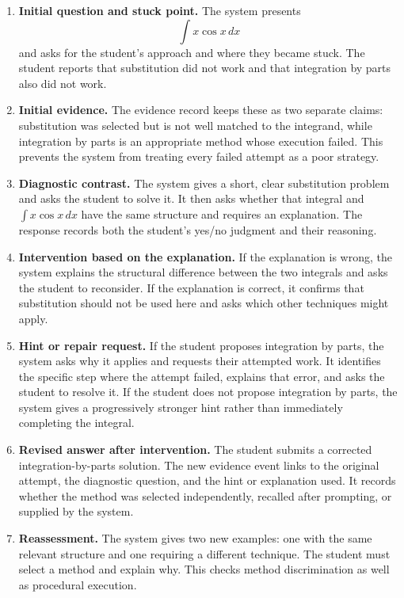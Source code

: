 \documentclass[11pt]{article}
\begin{document}
\begin{enumerate}
    \item \textbf{Initial question and stuck point.} The system presents
    \[
    \int x\cos x\,dx
    \]
    and asks for the student's approach and where they became stuck. The student reports that substitution did not work and that integration by parts also did not work.

    \item \textbf{Initial evidence.} The evidence record keeps these as two separate claims: substitution was selected but is not well matched to the integrand, while integration by parts is an appropriate method whose execution failed. This prevents the system from treating every failed attempt as a poor strategy.

    \item \textbf{Diagnostic contrast.} The system gives a short, clear substitution problem and asks the student to solve it. It then asks whether that integral and $\int x\cos x\,dx$ have the same structure and requires an explanation. The response records both the student's yes/no judgment and their reasoning.

    \item \textbf{Intervention based on the explanation.} If the explanation is wrong, the system explains the structural difference between the two integrals and asks the student to reconsider. If the explanation is correct, it confirms that substitution should not be used here and asks which other techniques might apply.

    \item \textbf{Hint or repair request.} If the student proposes integration by parts, the system asks why it applies and requests their attempted work. It identifies the specific step where the attempt failed, explains that error, and asks the student to resolve it. If the student does not propose integration by parts, the system gives a progressively stronger hint rather than immediately completing the integral.

    \item \textbf{Revised answer after intervention.} The student submits a corrected integration-by-parts solution. The new evidence event links to the original attempt, the diagnostic question, and the hint or explanation used. It records whether the method was selected independently, recalled after prompting, or supplied by the system.

    \item \textbf{Reassessment.} The system gives two new examples: one with the same relevant structure and one requiring a different technique. The student must select a method and explain why. This checks method discrimination as well as procedural execution.
\end{enumerate}
\end{document}
